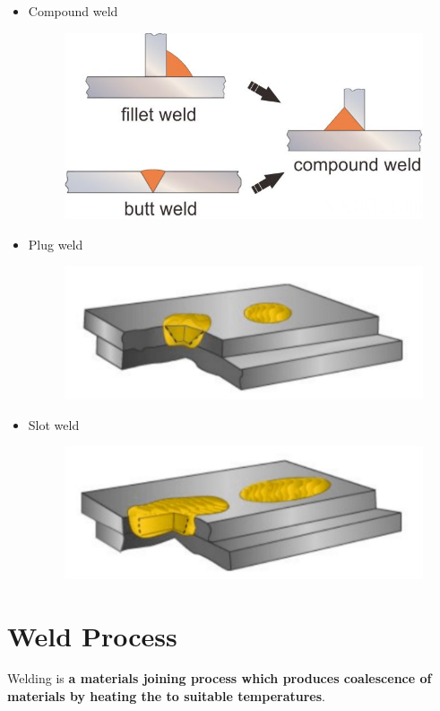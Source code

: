 \begin{itemize}
\begin{figure}[H]
\end{figure}
\item Compound weld
\begin{figure}[H]
\centering
\includegraphics[scale=1]{PIC/CH07/CW}
\end{figure}
\item Plug weld
\begin{figure}[H]
\centering
\includegraphics[scale=.6]{PIC/CH07/PLUG}
\end{figure}
\item Slot weld
\begin{figure}[H]
\centering
\includegraphics[scale=.6]{PIC/CH07/SLOT}
\end{figure}
\end{itemize}
\section{Weld Process}
Welding is \textbf{a materials joining process which produces coalescence of materials by heating the to suitable temperatures}.

